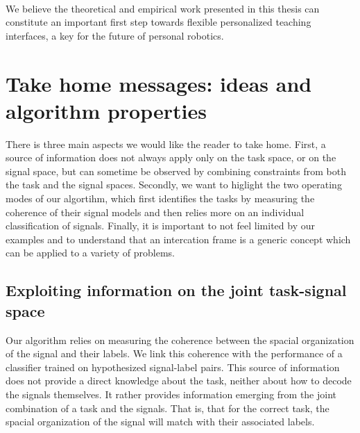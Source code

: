 \paragraph{} We believe the theoretical and empirical work presented in this thesis can constitute an important first step towards flexible personalized teaching interfaces, a key for the future of personal robotics.

\section{Take home messages: ideas and algorithm properties}


There is three main aspects we would like the reader to take home. First, a source of information does not always apply only on the task space, or on the signal space, but can sometime be observed by combining constraints from both the task and the signal spaces. Secondly, we want to higlight the two operating modes of our algortihm, which first identifies the tasks by measuring the coherence of their signal models and then relies more on an individual classification of signals. Finally, it is important to not feel limited by our examples and to understand that an intercation frame is a generic concept which can be applied to a variety of problems.


\subsection{Exploiting information on the joint task-signal space}

Our algorithm relies on measuring the coherence between the spacial organization of the signal and their labels. We link this coherence with the performance of a classifier trained on hypothesized signal-label pairs. This source of information does not provide a direct knowledge about the task, neither about how to decode the signals themselves. It rather provides information emerging from the joint combination of a task and the signals. That is, that for the correct task, the spacial organization of the signal will match with their associated labels. 

